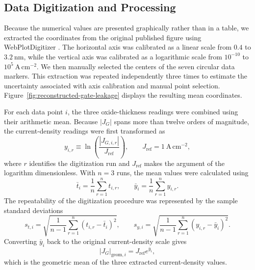 \documentclass[12pt]{article}
\begin{document}
\subsection{Data Digitization and Processing}

Because the numerical values are presented graphically rather than in a table, we extracted the coordinates from the original published figure using WebPlotDigitizer \cite{rohatgiWebPlotDigitizer}. The horizontal axis was calibrated as a linear scale from \(0.4\) to \(3.2~\mathrm{nm}\), while the vertical axis was calibrated as a logarithmic scale from \(10^{-10}\) to \(10^{5}~\mathrm{A\,cm^{-2}}\). We then manually selected the centers of the seven circular data markers. This extraction was repeated independently three times to estimate the uncertainty associated with axis calibration and manual point selection. Figure~\ref{fig:reconstructed-gate-leakage} displays the resulting mean coordinates.

For each data point \(i\), the three oxide-thickness readings were combined using their arithmetic mean. Because \(\left|J_G\right|\) spans more than twelve orders of magnitude, the current-density readings were first transformed as
\begin{equation}
    y_{i,r}
    \equiv
    \ln\left(
        \frac{\left|J_{G,i,r}\right|}{J_{\mathrm{ref}}}
    \right),
    \qquad
    J_{\mathrm{ref}}=1~\mathrm{A\,cm^{-2}},
    \label{eq:digitized-log-current}
\end{equation}
where \(r\) identifies the digitization run and \(J_{\mathrm{ref}}\) makes the argument of the logarithm dimensionless. With \(n=3\) runs, the mean values were calculated using
\begin{equation}
    \bar{t}_i=\frac{1}{n}\sum_{r=1}^{n}t_{i,r},
    \qquad
    \bar{y}_i=\frac{1}{n}\sum_{r=1}^{n}y_{i,r}.
    \label{eq:digitized-means}
\end{equation}
The repeatability of the digitization procedure was represented by the sample standard deviations
\begin{equation}
    s_{t,i}
    =\sqrt{\frac{1}{n-1}\sum_{r=1}^{n}\left(t_{i,r}-\bar{t}_i\right)^2},
    \qquad
    s_{y,i}
    =\sqrt{\frac{1}{n-1}\sum_{r=1}^{n}\left(y_{i,r}-\bar{y}_i\right)^2}.
    \label{eq:digitized-standard-deviations}
\end{equation}
Converting \(\bar{y}_i\) back to the original current-density scale gives
\begin{equation}
    \left|J_G\right|_{\mathrm{geom},i}
    =J_{\mathrm{ref}}e^{\bar{y}_i},
    \label{eq:digitized-geometric-mean}
\end{equation}
which is the geometric mean of the three extracted current-density values.
\end{document}

